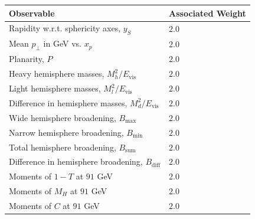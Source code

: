 \documentclass[aps,preprint,floatfix,nofootinbib,showpacs]{revtex4-1}
\begin{document}
 \begin{table}[tbp]
  \begin{center}
   \begin{tabular}{l | l}
\hline \hline
Observable \hspace{1cm}                                        &  Associated Weight \\ \hline
Rapidity w.r.t. sphericity axes, $y_S$                         & \hspace{1cm} $2.0$ \\ \hline
Mean $p_\perp$ in GeV vs. $x_p$                                & \hspace{1cm} $2.0$ \\ \hline
Planarity, $P$                                                 & \hspace{1cm} $2.0$ \\ \hline
Heavy hemisphere masses, $M_h^2/E_\text{vis}$                  & \hspace{1cm} $2.0$ \\ \hline
Light hemisphere masses, $M_l^2/E_\text{vis}$                  & \hspace{1cm} $2.0$ \\ \hline
Difference in hemisphere masses, $M_d^2/E_\text{vis}$          & \hspace{1cm} $2.0$ \\ \hline
Wide hemisphere broadening, $B_\text{max}$                     & \hspace{1cm} $2.0$ \\ \hline
Narrow hemisphere broadening, $B_\text{min}$                   & \hspace{1cm} $2.0$ \\ \hline
Total hemisphere broadening, $B_\text{sum}$                    & \hspace{1cm} $2.0$ \\ \hline
Difference in hemisphere broadening, $B_\text{diff}$           & \hspace{1cm} $2.0$ \\ \hline
Moments of $1 - T$ at $91$ GeV                                 & \hspace{1cm} $2.0$ \\ \hline
Moments of $M_H$ at $91$ GeV                                   & \hspace{1cm} $2.0$ \\ \hline
Moments of $C$ at $91$ GeV                                     & \hspace{1cm} $2.0$ \\ \hline

\end{tabular}
\end{center}
\end{table}
\end{document}
